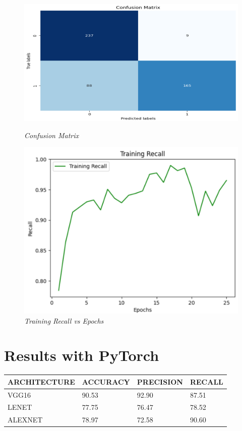 \documentclass[12pt, a4paper]{report}
\begin{document}
\begin{figure}[htbp]
    \centering
    \begin{minipage}{0.4\textwidth}
        \centering
        \includegraphics[width=\linewidth]{report images/image19.png}
        \caption{\textit{Confusion Matrix}}
    \end{minipage}%
    \hspace{0.05\textwidth} %
    \begin{minipage}{0.4\textwidth}
        \centering
        \includegraphics[width=\linewidth]{report images/image20.png}
        \caption{\textit{Training Recall vs Epochs}}
    \end{minipage}
\end{figure}

\vspace{8cm}

\section{Results with PyTorch}
\begin{center}
\begin{tabular}{|l|l|l|l|}
\hline
ARCHITECTURE & ACCURACY & PRECISION & RECALL \\
\hline
VGG16 & 90.53 & 92.90 & 87.51 \\
\hline
LENET & 77.75 & 76.47 & 78.52 \\
\hline
ALEXNET & 78.97 & 72.58 & 90.60 \\
\hline
\end{tabular}
\end{center}
\end{document}
